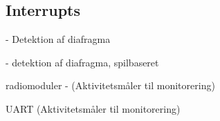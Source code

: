 \subsection{Interrupts}
- Detektion af diafragma

- detektion af diafragma, spilbaseret

radiomoduler - (Aktivitetsmåler til monitorering)

UART (Aktivitetsmåler til monitorering)



%
%
%
